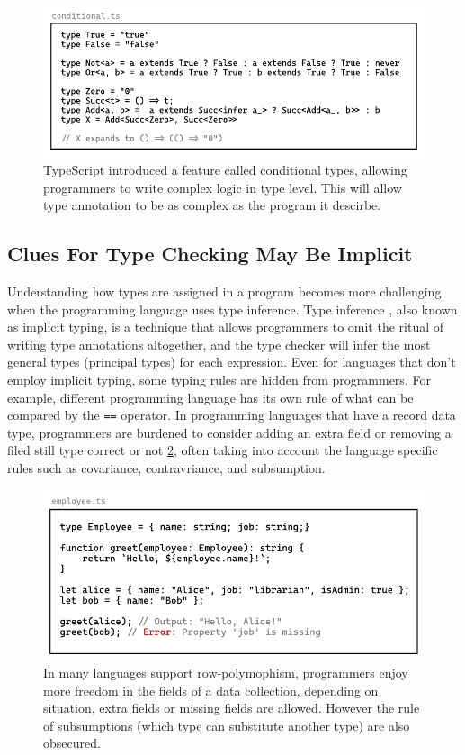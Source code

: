 \begin{figure}[hbt]
  \includegraphics[width=\linewidth]{Conditional}
  \caption{
    \label{fig:conditional}
   TypeScript introduced a feature called conditional types, allowing programmers to write complex logic in type level. This will allow type annotation to be as complex as the program it descirbe.
    }
\end{figure}

\subsection{Clues For Type Checking May Be Implicit}
Understanding how types are assigned in a program becomes more challenging when the programming language uses type inference. Type inference \cite{Damas1982-sc},  also known as implicit typing, is a technique that allows programmers to omit the ritual of writing type annotations altogether, and the type checker will infer the most general types (principal types) for each expression. Even for languages that don't employ implicit typing, some typing rules are hidden from programmers.
For example, different programming language has its own rule of what can be compared by the \texttt{==} operator. In programming languages that have a record data type, programmers are burdened to consider adding an extra field or removing a filed still type correct or not \ref{fig:row-polymophism}, often taking into account the language specific rules such as covariance, contravriance, and subsumption.

\begin{figure}[hbt]
  \includegraphics[width=\linewidth]{RowPolymorphism.pdf}
  \caption{
    \label{fig:row-polymophism}
   In many languages support row-polymophism, programmers enjoy more freedom in the fields of a data collection,  depending on situation,  extra fields or missing fields are allowed. However the rule of subsumptions (which type can substitute another type) are also obsecured.
    }
\end{figure}


